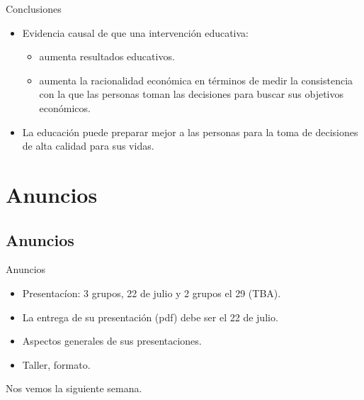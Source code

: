 \documentclass[11pt, aspectratio=169, compress]{beamer}
\makeatletter
\def\beamer@writeslidentry@miniframesoff{%
	\expandafter\beamer@ifempty\expandafter{\beamer@framestartpage}{}%
	{%
		\clearpage\beamer@notesactions%
	}
}
\newcommand*{\miniframesoff}{\let\beamer@writeslidentry=\beamer@writeslidentry@miniframesoff}
\makeatother
\begin{document}
\begin{frame}{Conclusiones}
	\begin{itemize}
		\item Evidencia causal de que una intervención educativa: 
		\begin{itemize}
			\item aumenta resultados educativos.
			\item aumenta la racionalidad económica en términos de medir la consistencia con la que las personas toman las decisiones para buscar sus objetivos económicos.
		\end{itemize}
	\item La educación puede preparar mejor a las personas para la toma de decisiones de alta calidad para sus vidas. 
	\end{itemize}
\end{frame}
\section{Anuncios}
\subsection{Anuncios}
\begin{frame}{Anuncios}
\begin{itemize}
	\item Presentacíon: 3 grupos, 22 de julio y 2 grupos el 29 (TBA). 
	\item La entrega de su presentación (pdf) debe ser el 22 de julio. 
	\item Aspectos generales de sus presentaciones. 
	\item Taller, formato. 
\end{itemize}
\end{frame}
\miniframesoff 	
\begin{frame}
Nos vemos la siguiente semana. 
\end{frame}
\end{document}

